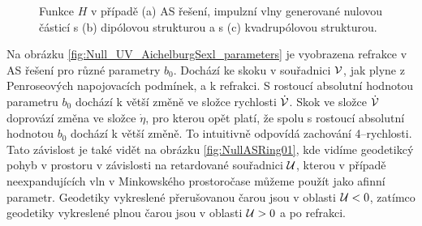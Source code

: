 \begin{figure}[ht]
    \centering
    \begin{subfigure}[b]{0.32\textwidth}
       \caption{}
    \end{subfigure}
     \hfill
     \begin{subfigure}[b]{0.32\textwidth}
       \caption{}
     \end{subfigure}
     \hfill
     \begin{subfigure}[b]{0.32\textwidth}
       \caption{}
     \end{subfigure}
    \caption{Funkce $H$ v případě (a) AS řešení, impulzní vlny generované nulovou částicí s (b) dipólovou strukturou a s (c) kvadrupólovou strukturou.}
    \label{fig:mono_di_kvadru}
\end{figure}

Na obrázku \ref{fig:Null_UV_AichelburgSexl_parameters} je vyobrazena refrakce v AS řešení pro různé
parametry $b_0$. Dochází ke skoku v souřadnici $\mathcal{V}$, jak plyne z Penroseových napojovacích podmínek, a k refrakci.
S rostoucí absolutní hodnotou parametru $b_0$ dochází k větší změně ve složce rychlosti $\dot {\mathcal{V}}$.
Skok ve složce $\dot {\mathcal{V}}$ doprovází změna ve složce $\dot \eta$, pro kterou opět platí, že spolu s
rostoucí absolutní hodnotou $b_0$ dochází k větší změně. To intuitivně odpovídá zachování 4--rychlosti.
Tato závislost je také vidět na obrázku \ref{fig:NullASRing01},
kde vidíme geodetikcý pohyb v prostoru v závislosti na retardované souřadnici $\mathcal{U}$, kterou v případě neexpandujících vln
v Minkowského prostoročase můžeme použít jako afinní parametr. Geodetiky vykreslené přerušovanou čarou jsou v oblasti $\mathcal{U} < 0$,
zatímco geodetiky vykreslené plnou čarou jsou v oblasti $\mathcal{U} > 0$ a po refrakci.


